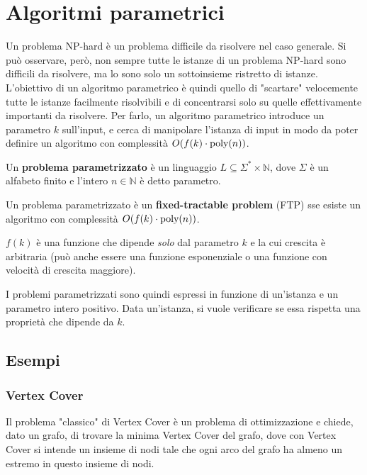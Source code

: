 \chapter{Algoritmi parametrici}
Un problema NP-hard è un problema difficile da risolvere nel caso generale. Si può osservare, però, non sempre tutte le istanze di un problema NP-hard sono difficili da risolvere, ma lo sono solo un sottoinsieme ristretto di istanze.\\
L'obiettivo di un algoritmo parametrico è quindi quello di "scartare" velocemente tutte le istanze facilmente risolvibili e di concentrarsi solo su quelle effettivamente importanti da risolvere.
Per farlo, un algoritmo parametrico introduce un parametro $k$ sull'input, e cerca di manipolare l'istanza di input in modo da poter definire un algoritmo con complessità $O(f(k) \cdot \textnormal{poly}(n))$.

\begin{defn}
    Un \textbf{problema parametrizzato} è un linguaggio $L \subseteq \Sigma^* \times \mathbb{N}$, dove $\Sigma$ è un alfabeto finito e l'intero $n \in \mathbb{N}$ è detto parametro.
\end{defn}

\begin{defn}
    Un problema parametrizzato è un \textbf{fixed-tractable problem} (FTP) sse esiste un algoritmo con complessità $O(f(k) \cdot \textnormal{poly}(n))$.

    $f(k)$ è una funzione che dipende \textit{solo} dal parametro $k$ e la cui crescita è arbitraria (può anche essere una funzione esponenziale o una funzione con velocità di crescita maggiore).
\end{defn}

I problemi parametrizzati sono quindi espressi in funzione di un'istanza e un parametro intero positivo. Data un'istanza, si vuole verificare se essa rispetta una proprietà che dipende da $k$.

\section{Esempi}
\subsection{Vertex Cover}
Il problema "classico" di Vertex Cover è un problema di ottimizzazione e chiede, dato un grafo, di trovare la minima Vertex Cover del grafo, dove con Vertex Cover si intende un insieme di nodi tale che ogni arco del grafo ha almeno un estremo in questo insieme di nodi.


